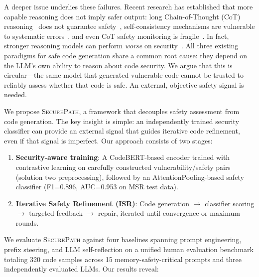 \documentclass[10pt,conference]{IEEEtran}
\begin{document}
A deeper issue underlies these failures. Recent research has established that more capable reasoning does not imply safer output: long Chain-of-Thought (CoT) reasoning~\cite{cot} does not guarantee safety~\cite{safechain}, self-consistency mechanisms are vulnerable to systematic errors~\cite{tooconsistent}, and even CoT safety monitoring is fragile~\cite{cotmonitor}. In fact, stronger reasoning models can perform \textit{worse} on security~\cite{chromesecbench,lrmsafety}. All three existing paradigms for safe code generation share a common root cause: they depend on the LLM's own ability to reason about code security. We argue that this is circular---the same model that generated vulnerable code cannot be trusted to reliably assess whether that code is safe. An external, objective safety signal is needed.

We propose \textsc{SecurePath}, a framework that decouples safety assessment from code generation. The key insight is simple: an independently trained security classifier can provide an external signal that guides iterative code refinement, even if that signal is imperfect. Our approach consists of two stages:

\begin{enumerate}
\item \textbf{Security-aware training}: A CodeBERT-based encoder trained with contrastive learning on carefully constructed vulnerability/safety pairs (solution two preprocessing), followed by an AttentionPooling-based safety classifier (F1=0.896, AUC=0.953 on MSR test data).
\item \textbf{Iterative Safety Refinement (ISR)}: Code generation $\rightarrow$ classifier scoring $\rightarrow$ targeted feedback $\rightarrow$ repair, iterated until convergence or maximum rounds.
\end{enumerate}

We evaluate \textsc{SecurePath} against four baselines spanning prompt engineering, prefix steering, and LLM self-reflection on a unified human evaluation benchmark totaling 320 code samples across 15 memory-safety-critical prompts and three independently evaluated LLMs. Our results reveal:
\end{document}
